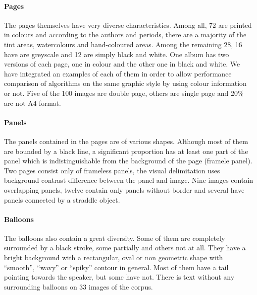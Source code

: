 
\paragraph{Pages} %
\label{par:pages}
The pages themselves have very diverse characteristics.
Among all, 72 are printed in colours and according to the authors and periods, there are a majority of the tint areas, watercolours and hand-coloured areas.
Among the remaining 28, 16 have are greyscale and 12 are simply black and white.
One album has two versions of each page, one in colour and the other one in black and white.
We have integrated an examples of each of them in order to allow performance comparison of algorithms on the same graphic style by using colour information or not.
Five of the 100 images are double page, others are single page and 20\% are not A4 format.

\paragraph{Panels} %
\label{par:panels}
The panels contained in the pages are of various shapes.
Although most of them are bounded by a black line, a significant proportion has at least one part of the panel which is indistinguishable from the background of the page (framele panel).
Two pages consist only of frameless panels, the visual delimitation uses background contrast difference between the panel and image.
Nine images contain overlapping panels, twelve contain only panels without border and several have panels connected by a straddle object.


\paragraph{Balloons} %
\label{par:balloons}
The balloons also contain a great diversity.
Some of them are completely surrounded by a black stroke, some partially and others not at all.
They have a bright background with a rectangular, oval or non geometric shape with ``smooth'', ``wavy'' or ``spiky'' contour in general.
Most of them have a tail pointing towards the speaker, but some have not.
There is text without any surrounding balloons on 33 images of the corpus.

